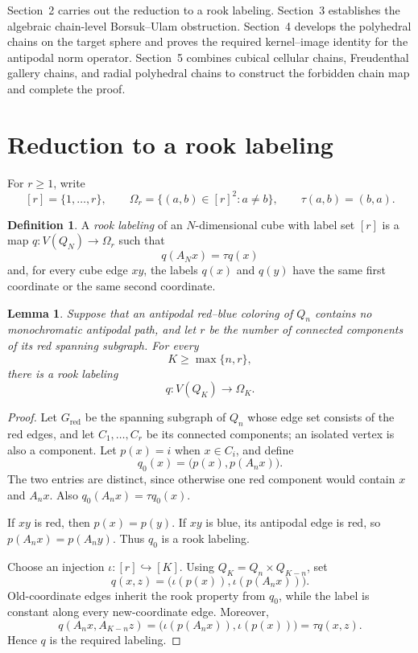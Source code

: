 \documentclass[reqno,12pt]{amsart}
\newtheorem{lemma}[theorem]{Lemma}
\theoremstyle{definition}
\newtheorem{definition}[theorem]{Definition}
\begin{document}
Section~2 carries out the reduction to a rook labeling.  Section~3
establishes the algebraic chain-level Borsuk--Ulam obstruction.
Section~4 develops the polyhedral chains on the target sphere and
proves the required kernel--image identity for the antipodal norm
operator.  Section~5 combines cubical cellular chains, Freudenthal
gallery chains, and radial polyhedral chains to construct the
forbidden chain map and complete the proof.

\section{Reduction to a rook labeling}

For \(r\geq1\), write
\[
 [r]=\{1,\ldots,r\},\qquad
 \Omega_r=\{(a,b)\in[r]^2:a\ne b\},
 \qquad \tau(a,b)=(b,a).
\]

\begin{definition}
A \emph{rook labeling} of an \(N\)-dimensional cube with label set
\([r]\) is a map \(q:V(Q_N)\to\Omega_r\) such that
\[
 q(A_Nx)=\tau q(x)
\]
and, for every cube edge \(xy\), the labels \(q(x)\) and \(q(y)\)
have the same first coordinate or the same second coordinate.
\end{definition}


\begin{lemma}\label{lem:reduction}
Suppose that an antipodal red--blue coloring of \(Q_n\) contains no
monochromatic antipodal path, and let \(r\) be the number of connected
components of its red spanning subgraph.  For every
\[
 K\geq\max\{n,r\},
\]
there is a rook labeling
\[
 q:V(Q_K)\longrightarrow\Omega_K.
\]
\end{lemma}

\begin{proof}
Let \(G_{\mathrm{red}}\) be the spanning subgraph of \(Q_n\) whose edge
set consists of the red edges, and let \(C_1,\ldots,C_r\) be its
connected components; an isolated vertex is also a component.  Let
\(p(x)=i\) when \(x\in C_i\), and define
\[
 q_0(x)=\bigl(p(x),p(A_nx)\bigr).
\]
The two entries are distinct, since otherwise one red component would
contain \(x\) and \(A_nx\).  Also \(q_0(A_nx)=\tau q_0(x)\).

If \(xy\) is red, then \(p(x)=p(y)\).  If \(xy\) is blue, its antipodal
edge is red, so \(p(A_nx)=p(A_ny)\).  Thus \(q_0\) is a rook labeling.

Choose an injection \(\iota:[r]\hookrightarrow[K]\).  Using
\(Q_K=Q_n\times Q_{K-n}\), set
\[
 q(x,z)=\bigl(\iota(p(x)),\iota(p(A_nx))\bigr).
\]
Old-coordinate edges inherit the rook property from \(q_0\), while the
label is constant along every new-coordinate edge.  Moreover,
\[
 q(A_nx,A_{K-n}z)
 =\bigl(\iota(p(A_nx)),\iota(p(x))\bigr)
 =\tau q(x,z).
\]
Hence \(q\) is the required labeling.
\end{proof}
\end{document}

